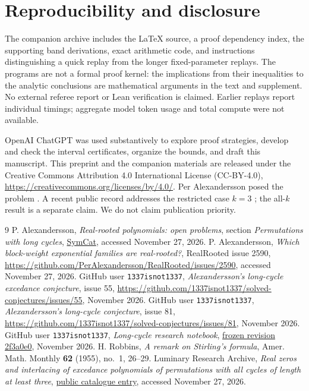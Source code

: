 \documentclass[11pt,reqno]{amsart}
\theoremstyle{remark}
\begin{document}
\section*{Reproducibility and disclosure}
The companion archive includes the \LaTeX{} source, a proof dependency index, the supporting band derivations, exact arithmetic code, and instructions distinguishing a quick replay from the longer fixed-parameter replays. The programs are not a formal proof kernel: the implications from their inequalities to the analytic conclusions are mathematical arguments in the text and supplement. No external referee report or Lean verification is claimed. Earlier replays report individual timings; aggregate model token usage and total compute were not available.

OpenAI ChatGPT was used substantively to explore proof strategies, develop and check the interval certificates, organize the bounds, and draft this manuscript. This preprint and the companion materials are released under the Creative Commons Attribution 4.0 International License (CC-BY-4.0), \url{https://creativecommons.org/licenses/by/4.0/}. Per Alexandersson posed the problem \cite{SymCat,AlexIssue}. A recent public record addresses the restricted case $k=3$ \cite{Luminary}; the all-$k$ result is a separate claim. We do not claim publication priority.

\enlargethispage{3\baselineskip}
\begin{thebibliography}{9}
 P. Alexandersson, \emph{Real-rooted polynomials: open problems}, section \emph{Permutations with long cycles}, \href{https://www.symmetricfunctions.com/realRootedOpenProblems.htm#permutations-with-long-cycles}{SymCat}, accessed November 27, 2026.
 P. Alexandersson, \emph{Which block-weight exponential families are real-rooted?}, RealRooted issue 2590, \url{https://github.com/PerAlexandersson/RealRooted/issues/2590}, accessed November 27, 2026.
 GitHub user \texttt{1337isnot1337}, \emph{Alexandersson's long-cycle excedance conjecture}, issue 55, \url{https://github.com/1337isnot1337/solved-conjectures/issues/55}, November 2026.
 GitHub user \texttt{1337isnot1337}, \emph{Alexandersson's long-cycle conjecture}, issue 81, \url{https://github.com/1337isnot1337/solved-conjectures/issues/81}, November 2026.
 GitHub user \texttt{1337isnot1337}, \emph{Long-cycle research notebook}, \href{https://github.com/1337isnot1337/solved-conjectures/blob/2f3a0e089bb70041a6d156e53e8431099075b74e/research/alexandersson-long-cycles/README.md}{frozen revision 2f3a0e0}, November 2026.
 H. Robbins, \emph{A remark on Stirling's formula}, Amer. Math. Monthly \textbf{62} (1955), no.~1, 26--29.
 Luminary Research Archive, \emph{Real zeros and interlacing of excedance polynomials of permutations with all cycles of length at least three}, \href{https://research.luminaryoddities.org/all-research?edition=1&paper=real-zeros-interlacing-excedance-polynomials-cycles-length-at-least-three}{public catalogue entry}, accessed November 27, 2026.
\end{thebibliography}
\end{document}
